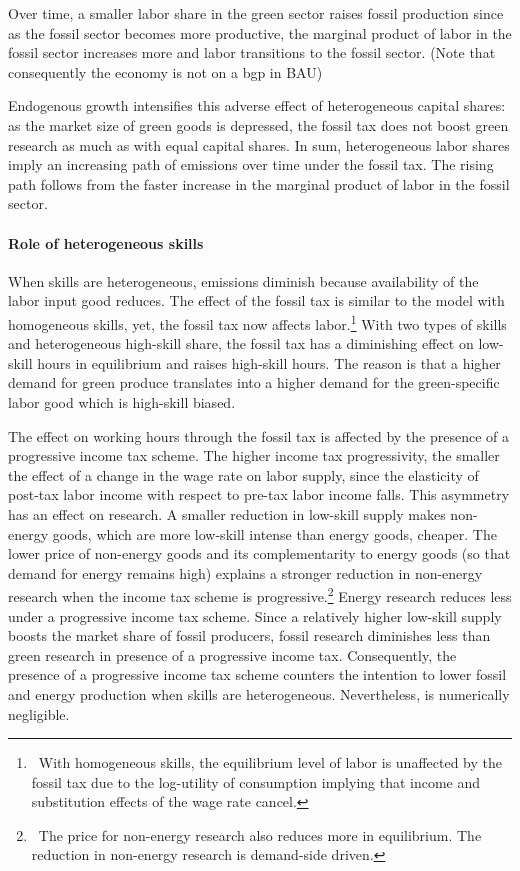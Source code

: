 Over time, a smaller labor share in the green sector raises fossil production since as the fossil sector becomes more productive, the marginal product of labor in the fossil sector increases more and labor transitions to the fossil sector.  (Note that consequently the economy is not on a bgp in BAU)

Endogenous growth intensifies this adverse effect of heterogeneous capital shares: as the market size of green goods is depressed, the fossil tax does not boost green research as much as with equal capital shares. In sum, heterogeneous labor shares imply an increasing path of emissions over time under the fossil tax. The rising path follows from the faster increase in the marginal product of labor in the fossil sector. 
 
 
 \paragraph{Role of heterogeneous skills}
 When skills are heterogeneous, emissions diminish because availability of the labor input good reduces. The effect of the fossil tax is similar to the model with homogeneous skills, yet, the fossil tax now affects labor.\footnote{\ With homogeneous skills, the equilibrium level of labor is unaffected by the fossil tax due to the log-utility of consumption implying that income and substitution effects of the wage rate cancel.}
 With two types of skills and heterogeneous high-skill share, the fossil tax has a diminishing effect on low-skill hours in equilibrium and raises high-skill hours. The reason is that a higher demand for green produce translates into a higher demand for the green-specific labor good which is high-skill biased. 
 
 The effect on working hours through the fossil tax is affected by the presence of a progressive income tax scheme. The higher income tax progressivity, the smaller the effect of a change in the wage rate on labor supply, since the elasticity of post-tax labor income with respect to pre-tax labor income falls. 
 This asymmetry has an effect on research. A smaller reduction in low-skill supply makes non-energy goods, which are more low-skill intense than energy goods, cheaper. The lower price of non-energy goods and its complementarity to energy goods (so that demand for energy remains high) explains a stronger reduction in non-energy research when the income tax scheme is progressive.\footnote{\ The price for non-energy research also reduces more in equilibrium. The reduction in non-energy research is demand-side driven.} Energy research reduces less under a progressive income tax scheme. Since a relatively higher low-skill supply boosts the market share of fossil producers, fossil research diminishes less than green research in presence of a progressive income tax. 
 Consequently, the presence of a progressive income tax scheme counters the intention to lower fossil and energy production when skills are heterogeneous. Nevertheless, is numerically negligible. 
 \clearpage
 
